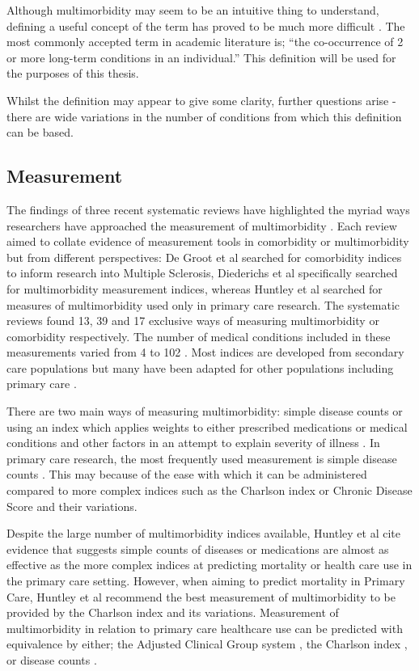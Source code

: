 \documentclass[12pt,]{report}
\begin{document}
\citep{RN226}

Although multimorbidity may seem to be an intuitive thing to understand,
defining a useful concept of the term has proved to be much more
difficult \citep{RN155}. The most commonly accepted term in academic
literature is; ``the co-occurrence of 2 or more long-term conditions in
an individual.'' This definition will be used for the purposes of this
thesis.

Whilst the definition may appear to give some clarity, further questions
arise - there are wide variations in the number of conditions from which
this definition can be based.

\subsection{Measurement}\label{subsec:mm-measures}

The findings of three recent systematic reviews have highlighted the
myriad ways researchers have approached the measurement of
multimorbidity \citep{RN16, RN34, RN29}. Each review aimed to collate
evidence of measurement tools in comorbidity or multimorbidity but from
different perspectives: De Groot et al \citeyearpar{RN16} searched for
comorbidity indices to inform research into Multiple Sclerosis,
Diederichs et al \citeyearpar{RN34} specifically searched for
multimorbidity measurement indices, whereas Huntley et al
\citeyearpar{RN29} searched for measures of multimorbidity used only in
primary care research. The systematic reviews found 13, 39 and 17
exclusive ways of measuring multimorbidity or comorbidity respectively.
The number of medical conditions included in these measurements varied
from 4 to 102 \citeyearpar{RN34}. Most indices are developed from
secondary care populations but many have been adapted for other
populations including primary care \citep{RN34, RN29}.

There are two main ways of measuring multimorbidity: simple disease
counts or using an index which applies weights to either prescribed
medications or medical conditions and other factors in an attempt to
explain severity of illness \citep{RN16, RN34, RN29}. In primary care
research, the most frequently used measurement is simple disease counts
\citep{RN29}. This may because of the ease with which it can be
administered compared to more complex indices such as the Charlson index
\citep{RN339} or Chronic Disease Score \citep{RN340} and their
variations.

Despite the large number of multimorbidity indices available, Huntley et
al \citeyearpar{RN29} cite evidence that suggests simple counts of
diseases or medications are almost as effective as the more complex
indices at predicting mortality or health care use in the primary care
setting. However, when aiming to predict mortality in Primary Care,
Huntley et al \citeyearpar{RN29} recommend the best measurement of
multimorbidity to be provided by the Charlson index \citep{RN339} and
its variations. Measurement of multimorbidity in relation to primary
care healthcare use can be predicted with equivalence by either; the
Adjusted Clinical Group system \citep{RN341}, the Charlson index
\citep{RN339}, or disease counts \citep{RN29}.
\end{document}
